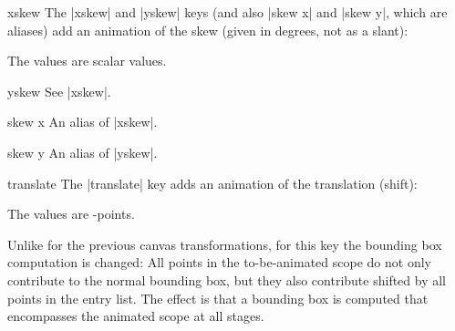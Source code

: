 \begin{animateattribute}{xskew}
    The |xskew| and |yskew| keys (and also |skew x| and |skew y|, which are
    aliases) add an animation of the skew (given in degrees, not as a slant):
\begin{codeexample}[
    preamble={\usepgfmodule{animations}},
    animation list={0.5,1,1.5,2},
]
\end{codeexample}
    The values are scalar values.
\end{animateattribute}

\begin{animateattribute}{yskew}
    See |xskew|.
\end{animateattribute}

\begin{animateattribute}{skew x}
    An alias of |xskew|.
\end{animateattribute}

\begin{animateattribute}{skew y}
    An alias of |yskew|.
\end{animateattribute}

\begin{animateattribute}{translate}
    The |translate| key adds an animation of the translation (shift):
\begin{codeexample}[
    preamble={\usepgfmodule{animations}},
    animation list={0.5,1,1.5,2},
]
\end{codeexample}
    The values are \pgfname-points.

    Unlike for the previous canvas transformations, for this key the bounding
    box computation is changed: All points in the to-be-animated scope do not
    only contribute to the normal bounding box, but they also contribute
    shifted by all points in the entry list. The effect is that a bounding box
    is computed that encompasses the animated scope at all stages.
\end{animateattribute}

